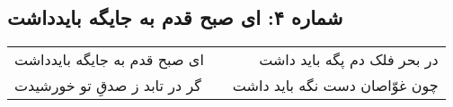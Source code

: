 \begin{center}
\section*{شماره ۴: ای صبح قدم به جایگه بایدداشت}
\label{sec:004}
\begin{longtable}{l p{0.5cm} r}
ای صبح قدم به جایگه بایدداشت
&&
در بحر فلک دم پگه باید داشت
\\
گر در تابد ز صدقِ تو خورشیدت
&&
چون غوّاصان دست نگه باید داشت
\\
\end{longtable}
\end{center}
